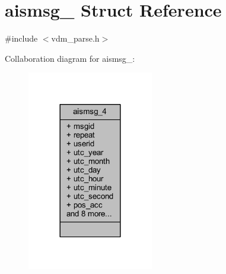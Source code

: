 \hypertarget{structaismsg__4}{}\section{aismsg\+\_ Struct Reference}
\label{structaismsg__4}


{\ttfamily \#include $<$vdm\+\_\+parse.\+h$>$}



Collaboration diagram for aismsg\+\_\+:
\nopagebreak
\begin{figure}[H]
\begin{center}
\leavevmode
\includegraphics[width=156pt]{structaismsg__4__coll__graph}
\end{center}
\end{figure}

